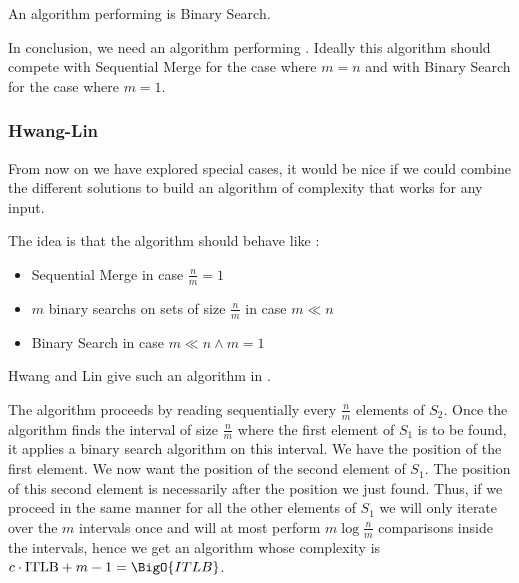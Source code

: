 An algorithm performing  is Binary Search.






In conclusion, we need an algorithm performing . Ideally this algorithm should compete with Sequential Merge for the case where $m = n$ and with Binary Search for the case where $m = 1$.



\subsubsection{Hwang-Lin}

From now on we have explored special cases, it would be nice if we could combine the different solutions to build an algorithm of complexity  that works for any input.

The idea is that the algorithm should behave like :

\begin{itemize}
\item Sequential Merge in case $\frac{n}{m} = 1$
\item $m$ binary searchs on sets of size $\frac{n}{m}$ in case $m \ll n$
\item Binary Search in case $m \ll n \land m = 1$
\end{itemize}

Hwang and Lin give such an algorithm in \cite{DBLP:journals/siamcomp/HwangL72}.

The algorithm proceeds by reading sequentially every $\frac{n}{m}$ elements of $S_2$. Once the algorithm finds the interval of size $\frac{n}{m}$ where the first element of $S_1$ is to be found, it applies a binary search algorithm on this interval. We have the position of the first element.
We now want the position of the second element of $S_1$. The position of this second element is necessarily after the position we just found. Thus, if we proceed in the same manner for all the other elements of $S_1$ we will only iterate over the $m$ intervals once and will at most perform $m \log\frac{n}{m}$ comparisons inside the intervals, hence we get an algorithm whose complexity is $c \cdot \text{ITLB} + m - 1 = \BigO{ITLB}$.

